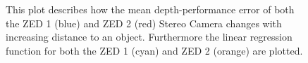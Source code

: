 \begin{figure}[h]
\begin{center}
		\caption{This plot describes how the mean depth-performance error of both the ZED 1 (blue) and ZED 2 (red) Stereo Camera changes with increasing distance to an object. Furthermore the linear regression function for both the ZED 1 (cyan) and ZED 2 (orange) are plotted. 
		}
		\label{plot:zed2Benchmark}
	\end{center}
\end{figure}
